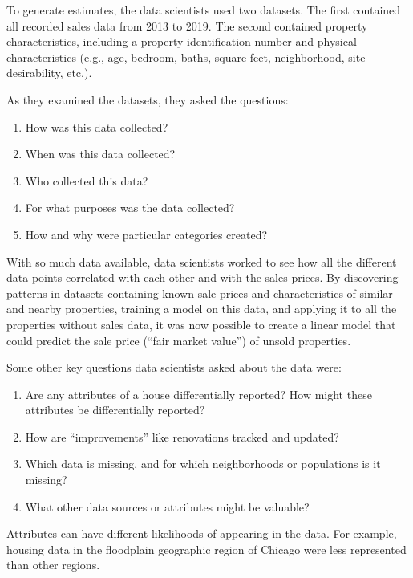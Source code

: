 \documentclass[
  letterpaper,
  DIV=11,
  numbers=noendperiod]{scrreprt}
\providecommand{\tightlist}{%
  \setlength{\itemsep}{0pt}\setlength{\parskip}{0pt}}\usepackage{longtable,booktabs,array}
\begin{document}
To generate estimates, the data scientists used two datasets. The first
contained all recorded sales data from 2013 to 2019. The second
contained property characteristics, including a property identification
number and physical characteristics (e.g., age, bedroom, baths, square
feet, neighborhood, site desirability, etc.).

As they examined the datasets, they asked the questions:

\begin{enumerate}
\def\labelenumi{\arabic{enumi}.}
\tightlist
\item
  How was this data collected?
\item
  When was this data collected?
\item
  Who collected this data?
\item
  For what purposes was the data collected?
\item
  How and why were particular categories created?
\end{enumerate}

With so much data available, data scientists worked to see how all the
different data points correlated with each other and with the sales
prices. By discovering patterns in datasets containing known sale prices
and characteristics of similar and nearby properties, training a model
on this data, and applying it to all the properties without sales data,
it was now possible to create a linear model that could predict the sale
price (``fair market value'') of unsold properties.

Some other key questions data scientists asked about the data were:

\begin{enumerate}
\def\labelenumi{\arabic{enumi}.}
\tightlist
\item
  Are any attributes of a house differentially reported? How might these
  attributes be differentially reported?
\item
  How are ``improvements'' like renovations tracked and updated?
\item
  Which data is missing, and for which neighborhoods or populations is
  it missing?
\item
  What other data sources or attributes might be valuable?
\end{enumerate}

Attributes can have different likelihoods of appearing in the data. For
example, housing data in the floodplain geographic region of Chicago
were less represented than other regions.
\end{document}
